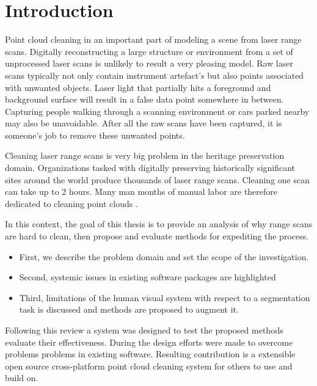 \chapter{Introduction}
Point cloud cleaning in an important part of modeling a scene from laser range scans. Digitally reconstructing a large structure or environment from a set of unprocessed laser scans is unlikely to result a very pleasing model. Raw laser scans typically not only contain instrument artefact's but also points associated with unwanted objects. Laser light that partially hits a foreground and background surface will result in a false data point somewhere in between. Capturing people walking through a scanning environment or cars parked nearby may also be unavoidable. After all the raw scans have been captured, it is someone's job to remove these unwanted points.

Cleaning laser range scans is very big problem in the heritage preservation domain. Organizations tasked with digitally preserving historically significant sites around the world produce thousands of laser range scans. Cleaning one scan can take up to 2 hours. Many man months of manual labor are therefore dedicated to cleaning point clouds \cite{Ruther2011}.

In this context, the goal of this thesis is to provide an analysis of why range scans are hard to clean, then propose and evaluate methods for expediting the process.

\begin{itemize}
	\item First, we describe the problem domain and set the scope of the investigation.
	\item Second, systemic issues in existing software packages are highlighted
	\item Third, limitations of the human visual system with respect to a segmentation task is discussed and methods are proposed to augment it. 
\end{itemize}

Following this review a system was designed to test the proposed methods evaluate their effectiveness. During the design efforts were made to overcome problems problems in existing software. Resulting contribution is a extensible open source cross-platform point cloud cleaning system for others to use and build on.